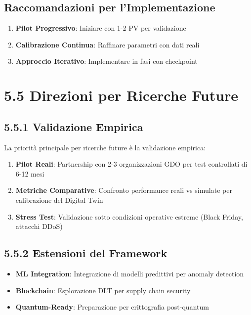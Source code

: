 \subsection{Raccomandazioni per l'Implementazione}

\begin{enumerate}
\item \textbf{Pilot Progressivo}: Iniziare con 1-2 PV per validazione
\item \textbf{Calibrazione Continua}: Raffinare parametri con dati reali
\item \textbf{Approccio Iterativo}: Implementare in fasi con checkpoint
\end{enumerate}

\section{5.5 Direzioni per Ricerche Future}

\subsection{5.5.1 Validazione Empirica}

La priorità principale per ricerche future è la validazione empirica:

\begin{enumerate}
\item \textbf{Pilot Reali}: Partnership con 2-3 organizzazioni GDO 
      per test controllati di 6-12 mesi
      
\item \textbf{Metriche Comparative}: Confronto performance reali vs 
      simulate per calibrazione del Digital Twin
      
\item \textbf{Stress Test}: Validazione sotto condizioni operative 
      estreme (Black Friday, attacchi DDoS)
\end{enumerate}

\subsection{5.5.2 Estensioni del Framework}

\begin{itemize}
\item \textbf{ML Integration}: Integrazione di modelli predittivi 
      per anomaly detection
      
\item \textbf{Blockchain}: Esplorazione DLT per supply chain security
      
\item \textbf{Quantum-Ready}: Preparazione per crittografia post-quantum
\end{itemize}

